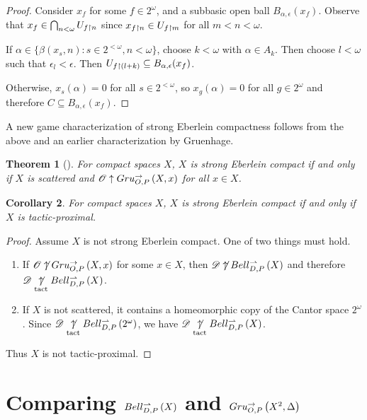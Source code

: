 \documentclass{amsart}
\newtheorem{theorem}{Theorem}[section]
\newtheorem{corollary}[theorem]{Corollary}
\theoremstyle{definition}
\begin{document}
\begin{proof}
    Consider \(x_f\) for some \(f\in 2^\omega\), and a subbasic open ball
    \(B_{\alpha,\epsilon}(x_f)\). Observe that
    \(x_f\in\bigcap_{n<\omega} U_{f\restriction n}\) since
    \(x_{f\restriction n}\in U_{f\restriction m}\) for all \(m<n<\omega\).

    If \(\alpha\in\{\beta(x_s,n):s\in2^{<\omega},n<\omega\}\), choose
    \(k<\omega\) with \(\alpha\in A_k\). Then choose \(l<\omega\) such that
    \(\epsilon_l<\epsilon\). Then
    \(U_{f\restriction(l+k)}\subseteq B_{\alpha,\epsilon}(x_f)\).

    Otherwise, \(x_s(\alpha)=0\) for all \(s\in2^{<\omega}\), so
    \(x_g(\alpha)=0\) for all \(g\in2^\omega\) and therefore
    \(C\subseteq B_{\alpha,\epsilon}(x_f)\).
  \end{proof}

  A new game characterization of strong Eberlein compactness follows
  from the above and an earlier characterization by Gruenhage.

  \begin{theorem}[\cite{MR752278}]
    For compact spaces \(X\),
    \(X\) is strong Eberlein compact if and only if
    \(X\) is scattered and \(\mathscr{O}\uparrow Gru_{O,P}^{\to}\left({X},{x}\right)\) for all \(x\in X\).
  \end{theorem}

  \begin{corollary}\label{mainResult}
    For compact spaces \(X\),
    \(X\) is strong Eberlein compact if and only if
    \(X\) is tactic-proximal.
  \end{corollary}

  \begin{proof}
    Assume \(X\) is not strong Eberlein compact. One of two things must hold.
      \begin{enumerate}
        \item
          If \(\mathscr{O}\not\uparrow Gru_{O,P}^{\to}\left({X},{x}\right)\) for some \(x\in X\), then
          \(\mathscr{D}\not\uparrow Bell_{D,P}^{\rightharpoonup}\left({X}\right)\) and therefore
          \(\mathscr{D}\underset{\text{tact}}{\not\uparrow} Bell_{D,P}^{\rightharpoonup}\left({X}\right)\).
        \item
          If \(X\) is not scattered, it contains a homeomorphic copy
          of the Cantor space \(2^\omega\). Since
          \(\mathscr{D}\underset{\text{tact}}{\not\uparrow} Bell_{D,P}^{\rightharpoonup}\left({2^\omega}\right)\),
          we have
          \(\mathscr{D}\underset{\text{tact}}{\not\uparrow} Bell_{D,P}^{\rightharpoonup}\left({X}\right)\).
      \end{enumerate}
    Thus \(X\) is not tactic-proximal.
  \end{proof}

\section{Comparing \(Bell_{D,P}^{\rightharpoonup}\left({X}\right)\) and \(Gru_{O,P}^{\to}\left({X^2},{\Delta}\right)\)}
\end{document}
